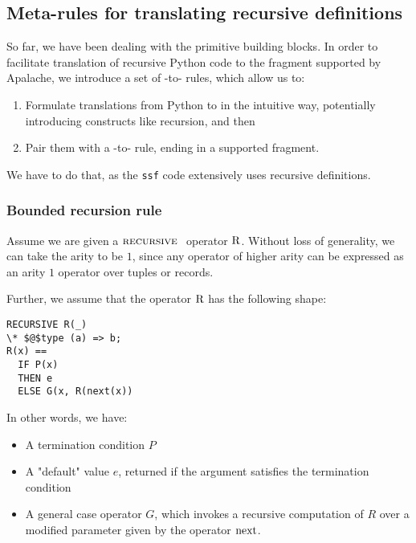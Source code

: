 \subsection{Meta-rules for translating recursive definitions}
\label{subsec:recrules}

So far, we have been dealing with the primitive building blocks. In order to
facilitate translation of recursive Python code to the \tlap{} fragment
supported by Apalache, we introduce a set of \tlap{}-to-\tlap{} rules, which
allow us to:

\begin{enumerate}
  \item Formulate translations from Python to \tlap{} in the
    intuitive way, potentially introducing constructs like recursion, and then

  \item Pair them with a \tlap{}-to-\tlap{} rule, ending in a supported
      fragment.

\end{enumerate}

We have to do that, as the \texttt{ssf} code extensively uses recursive
definitions.

\subsubsection{Bounded recursion rule}

Assume we are given a $\textsc{recursive }$ operator $\mathrm{R}$. Without loss of generality,
we can take the arity to be $1$, since any operator of higher arity can be
expressed as an arity $1$ operator over tuples or records.

Further, we assume that the operator $\mathrm{R}$ has the following shape:

\begin{lstlisting}[language=tla,columns=fullflexible]
RECURSIVE R(_)
\* $@$type (a) => b;
R(x) ==
  IF P(x)
  THEN e
  ELSE G(x, R(next(x))
\end{lstlisting}
%

In other words, we have:

\begin{itemize}
  \item A termination condition $P$
  \item A "default" value $e$, returned if the argument satisfies the termination condition
  \item A general case operator $G$, which invokes a recursive computation of $R$ over a modified parameter given by the operator $\mathrm{next}$.
\end{itemize}
%

